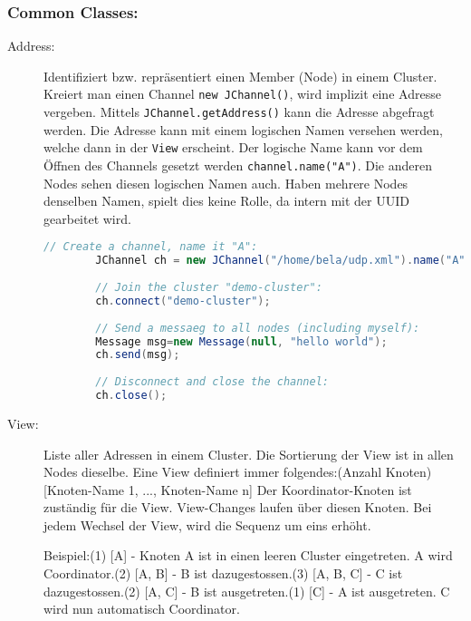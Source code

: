 \subsubsection{Common Classes:}
\begin{description}
	\item[Address:] Identifiziert bzw. repräsentiert einen Member (Node) in einem Cluster. Kreiert man einen Channel \verb|new JChannel()|, wird implizit eine Adresse vergeben. Mittels \verb|JChannel.getAddress()| kann die Adresse abgefragt werden. Die Adresse kann mit einem logischen Namen versehen werden, welche dann in der \verb|View| erscheint. Der logische Name kann vor dem Öffnen des Channels gesetzt werden \verb|channel.name("A")|. Die anderen Nodes sehen diesen logischen Namen auch. Haben mehrere Nodes denselben Namen, spielt dies keine Rolle, da intern mit der UUID gearbeitet wird.
	
	\begin{lstlisting}[language=Java]
		// Create a channel, name it "A":
		JChannel ch = new JChannel("/home/bela/udp.xml").name("A");
		
		// Join the cluster "demo-cluster":
		ch.connect("demo-cluster");
		
		// Send a messaeg to all nodes (including myself):
		Message msg=new Message(null, "hello world");
		ch.send(msg);
		
		// Disconnect and close the channel:
		ch.close();
	\end{lstlisting}
	
	\item[View:] Liste aller Adressen in einem Cluster. Die Sortierung der View ist in allen Nodes dieselbe. Eine View definiert immer folgendes: (Anzahl Knoten) [Knoten-Name 1, ..., Knoten-Name n]\newline
	Der Koordinator-Knoten ist zuständig für die View. View-Changes laufen über diesen Knoten. Bei jedem Wechsel der View, wird die Sequenz um eins erhöht.
		
	Beispiel:\newline
	[A|0] (1) [A] - Knoten A ist in einen leeren Cluster eingetreten. A wird Coordinator.\newline
	[A|1] (2) [A, B] - B ist dazugestossen.\newline
	[A|2] (3) [A, B, C] - C ist dazugestossen.\newline
	[A|3] (2) [A, C] - B ist ausgetreten.\newline
	[C|4] (1) [C] - A ist ausgetreten. C wird nun automatisch Coordinator.
		

\end{description}
